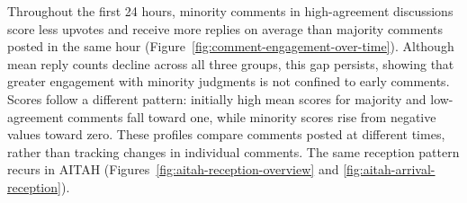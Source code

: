 Throughout the first 24 hours, minority comments in high-agreement discussions score less upvotes and receive more replies on average than majority comments posted in the same hour (Figure~\ref{fig:comment-engagement-over-time}). Although mean reply counts decline across all three groups, this gap persists, showing that greater engagement with minority judgments is not confined to early comments. Scores follow a different pattern: initially high mean scores for majority and low-agreement comments fall toward one, while minority scores rise from negative values toward zero. These profiles compare comments posted at different times, rather than tracking changes in individual comments. 
 The same reception pattern recurs in AITAH
(Figures~\ref{fig:aitah-reception-overview} and \ref{fig:aitah-arrival-reception}).





